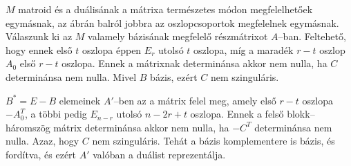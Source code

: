 $M$ matroid és a duálisának a mátrixa természetes módon megfelelhetőek
egymásnak, az ábrán balról jobbra az oszlopcsoportok megfelelnek egymásnak.
Válaszunk ki az $M$ valamely bázisának megfelelő részmátrixot $A$--ban.
Feltehető, hogy ennek első $t$ oszlopa éppen $E_r$ utolsó $t$ oszlopa, míg a
maradék $r-t$ oszlop $A_0$ első $r-t$ oszlopa. Ennek a mátrixnak determinánsa
akkor nem nulla, ha $C$ determinánsa nem nulla. Mivel $B$ bázis, ezért $C$ nem
szinguláris.

$B^*=E-B$ elemeinek $A'$--ben az a mátrix felel meg, amely első $r-t$ oszlopa
$-A_0^T$, a többi pedig $E_{n-r}$ utolsó $n-2r+t$ oszlopa. Ennek a felső
blokk--háromszög mátrix determinánsa akkor nem nulla, ha $-C^T$ determinánsa nem
nulla.  Azaz, hogy $C$ nem szinguláris. Tehát a bázis komplementere is bázis, és
fordítva, és ezért $A'$ valóban a duálist reprezentálja.
